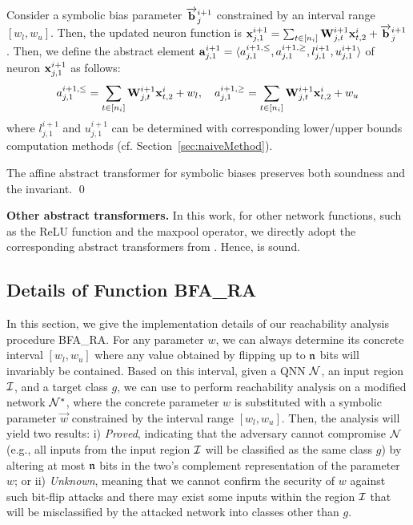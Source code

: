 Consider a symbolic bias parameter $\overrightarrow{{\mathbf{b}}}^{i+1}_j$ constrained by an interval range $[w_l,w_u]$. Then, the updated neuron function is ${\mathbf{x}}^{i+1}_{j,1}=\sum_{t\in[n_i]}{\mathbf{W}}^{i+1}_{j,t}{\mathbf{x}}^{i}_{t,2}+\overrightarrow{{\mathbf{b}}}^{i+1}_j$. Then, we define the abstract element 
${\mathbf{a}}^{i+1}_{j,1}=\langle a^{i+1,\le}_{j,1}, a^{i+1,\ge}_{j,1},  l^{i+1}_{j,1}, u^{i+1}_{j,1}\rangle$ of neuron ${\mathbf{x}}^{i+1}_{j,1}$ as follows:
\[
      a^{i+1,\le}_{j,1}= \sum_{t\in[n_i]}{\mathbf{W}}^{i+1}_{j,t}{\mathbf{x}}^{i}_{t,2} + w_l, \quad  a^{i+1,\ge}_{j,1}= \sum_{t\in[n_i]}{\mathbf{W}}^{i+1}_{j,t}{\mathbf{x}}^{i}_{t,2} + w_u 
\] 
where $l^{i+1}_{j,1}$ and $u^{i+1}_{j,1}$ can be determined with corresponding lower/upper bounds computation methods (cf. Section~\ref{sec:naiveMethod}). 


\begin{theorem}\label{the:deepPolyR_bias}
    The affine abstract transformer for symbolic biases preserves both soundness and the invariant. \qed
\end{theorem}


\noindent
{\bf Other abstract transformers.}
In this work, for other network functions, such as the ReLU function and the maxpool operator, we directly adopt the corresponding abstract transformers from \deepPoly. Hence, \symPoly is sound.

\subsection{ Details of Function {\sf BFA\_RA}}\label{sec:bfa_ra}
In this section, we give the implementation details of our reachability analysis procedure {\sf BFA\_RA}. 
For any parameter $w$, we can always determine its concrete interval $[w_l,w_u]$ where any value obtained by flipping up to $\mathfrak{n}$ bits will invariably be contained. Based on this interval, given a QNN ${\mathcal{N}}$, an input region ${\mathcal{I}}$, and a target class $g$, we can use \symPoly to perform reachability analysis on a modified network ${\mathcal{N}}^\ast$, where the concrete parameter $w$ is substituted with a symbolic parameter $\overrightarrow{w}$ constrained by the interval range $[w_l,w_u]$. Then, the analysis will yield two results: i) \emph{Proved}, indicating that the adversary cannot compromise ${\mathcal{N}}$ (e.g., all inputs from the input region ${\mathcal{I}}$ will be classified as the same class $g$) by altering at most $\mathfrak{n}$ bits in the two's complement representation of the parameter $w$; or ii) \emph{Unknown}, meaning that we cannot confirm the security of $w$ against such bit-flip attacks and there may exist some inputs within the region ${\mathcal{I}}$ that will be misclassified by the attacked network into classes other than $g$.


